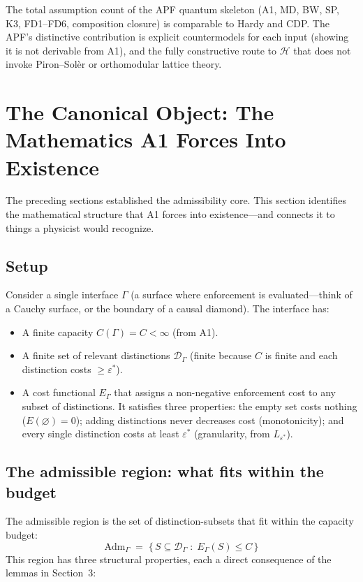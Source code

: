 \documentclass[11pt]{article}
\newcommand{\Adm}{\mathrm{Adm}}
\begin{document}
The total assumption count of the APF quantum skeleton (A1, MD, BW, SP, K3, FD1--FD6, composition closure) is comparable to Hardy and CDP.  The APF's distinctive contribution is explicit countermodels for each input (showing it is not derivable from A1), and the fully constructive route to $\mathcal{H}$ that does not invoke Piron--Sol\`er or orthomodular lattice theory.


\section{The Canonical Object: The Mathematics A1 Forces Into Existence}

The preceding sections established the admissibility core.  This section identifies the mathematical structure that A1 forces into existence---and connects it to things a physicist would recognize.

\subsection{Setup}

Consider a single interface $\Gamma$ (a surface where enforcement is evaluated---think of a Cauchy surface, or the boundary of a causal diamond).  The interface has:

\begin{itemize}[nosep]
\item A finite capacity $C(\Gamma) = C < \infty$ (from A1).
\item A finite set of relevant distinctions $\mathcal{D}_\Gamma$ (finite because $C$ is finite and each distinction costs $\ge \varepsilon^*$).
\item A cost functional $E_\Gamma$ that assigns a non-negative enforcement cost to any subset of distinctions.  It satisfies three properties: the empty set costs nothing ($E(\varnothing) = 0$); adding distinctions never decreases cost (monotonicity); and every single distinction costs at least $\varepsilon^*$ (granularity, from $L_{\varepsilon^*}$).
\end{itemize}

\subsection{The admissible region: what fits within the budget}

The admissible region is the set of distinction-subsets that fit within the capacity budget:
\begin{equation}
\Adm_\Gamma \;=\; \bigl\{\, S \subseteq \mathcal{D}_\Gamma \;:\; E_\Gamma(S) \le C \,\bigr\}
\end{equation}
This region has three structural properties, each a direct consequence of the lemmas in Section~3:
\end{document}
